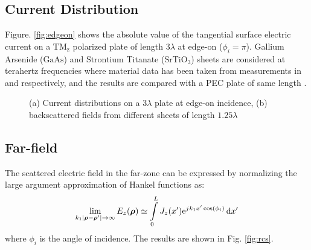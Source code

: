 \subsection{Current Distribution}
%
Figure. \ref{fig:edgeon} shows the absolute value of the tangential surface electric current on a $\mathrm{TM_z}$ polarized plate of length $3 \lambda$ at edge-on ($\phi_i = \pi$). Gallium Arsenide ($\mathrm{GaAs}$) and Strontium Titanate ($\mathrm{SrTiO_3}$) sheets are considered at terahertz frequencies where material data has been taken from measurements in \cite{Burke2000} and \cite{herranz2012high} respectively, and the results are compared with a PEC plate of same length \cite{senior1979backscattering}.
%
\begin{figure}[!htbp]
  \centering
  \caption{(a) Current distributions on a $3\lambda$ plate at edge-on incidence, (b) backscattered fields from different sheets of length $1.25\lambda$}
  \label{fig:Electric_properties_2DEG_thin}
\end{figure}
%
\subsection{Far-field}
%
The scattered electric field in the far-zone can be expressed by normalizing the large argument approximation of Hankel functions as:
%
\begin{equation}
  \lim_{k_1|\boldsymbol {\rho} - \boldsymbol {\rho}'|\to\infty} E_z(\boldsymbol {\rho}) \simeq \int \limits_{0}^{L} J_z(x') \mathrm{e}^{{j}\mkern1mu k_1 x' \cos(\phi_i)} \mathop{}\!\mathrm{d}{x'}
  \label{eq:far-field}
\end{equation}
%
where $\phi_i$ is the angle of incidence. The results are shown in Fig. \ref{fig:rcs}.
%
